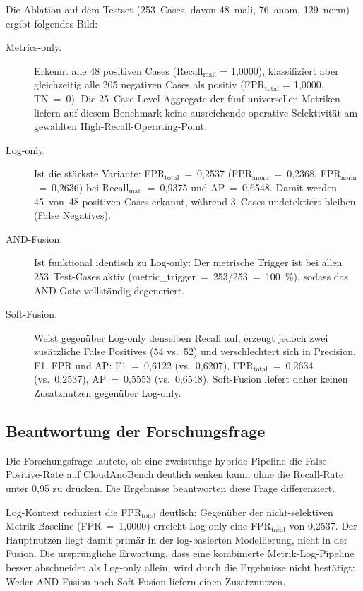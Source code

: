 Die Ablation auf dem Testset (253~Cases, davon 48~mali, 76~anom,
129~norm) ergibt folgendes Bild:

\begin{description}
  \item[Metrics-only.] Erkennt alle 48 positiven Cases
    (Recall$_{\text{mali}}$ = 1{,}0000), klassifiziert aber gleichzeitig alle
    205 negativen Cases als positiv (FPR$_{\text{total}}$ = 1{,}0000, TN~=~0).
    Die 25~Case-Level-Aggregate der fünf universellen Metriken liefern auf
    diesem Benchmark keine ausreichende operative Selektivität am gewählten
    High-Recall-Operating-Point.

  \item[Log-only.] Ist die stärkste Variante: FPR$_{\text{total}}$~=~0{,}2537
    (FPR$_{\text{anom}}$~=~0{,}2368, FPR$_{\text{norm}}$~=~0{,}2636) bei
    Recall$_{\text{mali}}$~=~0{,}9375 und AP~=~0{,}6548. Damit werden 45~von~48
    positiven Cases erkannt, während 3~Cases undetektiert bleiben
    (False Negatives).

  \item[AND-Fusion.] Ist funktional identisch zu Log-only: Der metrische
    Trigger ist bei allen 253~Test-Cases aktiv
    (metric\_trigger~=~253/253~=~100~\%), sodass das AND-Gate vollständig
    degeneriert.

  \item[Soft-Fusion.] Weist gegenüber Log-only denselben Recall auf, erzeugt
    jedoch zwei zusätzliche False Positives (54 vs.~52) und verschlechtert sich
    in Precision, F1, FPR und AP: F1~=~0{,}6122 (vs.~0{,}6207),
    FPR$_{\text{total}}$~=~0{,}2634 (vs.~0{,}2537), AP~=~0{,}5553
    (vs.~0{,}6548). Soft-Fusion liefert daher keinen Zusatznutzen gegenüber
    Log-only.
\end{description}

\subsection{Beantwortung der Forschungsfrage}

Die Forschungsfrage lautete, ob eine zweistufige hybride Pipeline die
False-Positive-Rate auf CloudAnoBench deutlich senken kann, ohne die
Recall-Rate unter 0{,}95 zu drücken. Die Ergebnisse beantworten diese Frage
differenziert.

Log-Kontext reduziert die FPR$_{\text{total}}$ deutlich: Gegenüber der
nicht-selektiven Metrik-Baseline (FPR~=~1{,}0000) erreicht Log-only
eine FPR$_{\text{total}}$ von 0{,}2537. Der Hauptnutzen liegt damit primär
in der log-basierten Modellierung, nicht in der Fusion. Die ursprüngliche
Erwartung, dass eine kombinierte Metrik-Log-Pipeline besser abschneidet als
Log-only allein, wird durch die Ergebnisse nicht bestätigt: Weder AND-Fusion
noch Soft-Fusion liefern einen Zusatznutzen.

